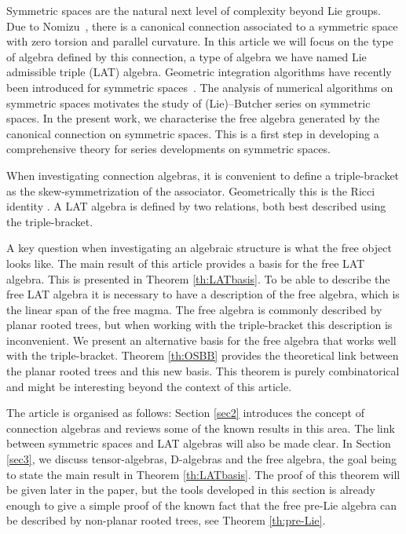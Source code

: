 \documentclass[pdftex]{sigma}
\numberwithin{equation}{section}
\begin{document}
Symmetric spaces are the natural next level of complexity beyond Lie groups. Due to Nomizu~\cite{Nomizu_54}, there is a canonical connection associated to a symmetric space with zero torsion and parallel curvature. In this article we will focus on the type of algebra defined by this connection, a type of algebra we have named Lie admissible triple (LAT) algebra. Geometric integration algorithms have recently been introduced for symmetric spaces~\cite{munthekaas24gio}. The analysis of numerical algorithms on symmetric spaces motivates the study of (Lie)--Butcher series on symmetric spaces. In the present work, we characterise the free algebra generated by the canonical connection on symmetric spaces. This is a first step in developing a comprehensive theory for series developments on symmetric spaces.

When investigating connection algebras, it is convenient to define a triple-bracket as the skew-symmetrization of the associator. Geometrically this is the Ricci identity \cite{Ricci_1900}. A LAT algebra is defined by two relations, both best described using the triple-bracket.

A key question when investigating an algebraic structure is what the free object looks like. The main result of this article provides a basis for the free LAT algebra. This is presented in Theorem \ref{th:LATbasis}. To be able to describe the free LAT algebra it is necessary to have a description of the free algebra, which is the linear span of the free magma. The free algebra is commonly described by planar rooted trees, but when working with the triple-bracket this description is inconvenient. We present an alternative basis for the free algebra that works well with the triple-bracket. Theorem \ref{th:OSBB} provides the theoretical link between the planar rooted trees and this new basis. This theorem is purely combinatorical and might be interesting beyond the context of this article.

The article is organised as follows: Section \ref{sec2} introduces the concept of connection algebras and reviews some of the known results in this area. The link between symmetric spaces and LAT algebras will also be made clear. In Section \ref{sec3}, we discuss tensor-algebras, D-algebras and the free algebra, the goal being to state the main result in Theorem \ref{th:LATbasis}. The proof of this theorem will be given later in the paper, but the tools developed in this section is already enough to give a simple proof of the known fact that the free pre-Lie algebra can be described by non-planar rooted trees, see Theorem \ref{th:pre-Lie}.
\end{document}
